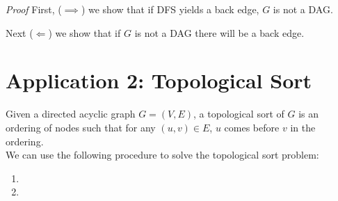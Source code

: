 \documentclass[11  pt]{exam}
\begin{document}
	\textit{Proof} First, ($\implies$) we show that if DFS yields a back edge, $G$ is not a DAG.\\
	\vspace{4cm}
	
	
	Next ($\Leftarrow$) we show that if $G$ is not a DAG there will be a back edge.\\
	
	\newpage
	
	\section{Application 2: Topological Sort}
	Given a directed acyclic graph $G = (V,E)$, a topological sort of $G$ is an ordering of nodes such that for any $(u,v) \in E$, $u$ comes before $v$ in the ordering. \\
	
	We can use the following procedure to solve the topological sort problem:
	\begin{enumerate}
		\item  %
		\item  %
		\vs{1cm}
	\end{enumerate}
	
	
	
\end{document}
